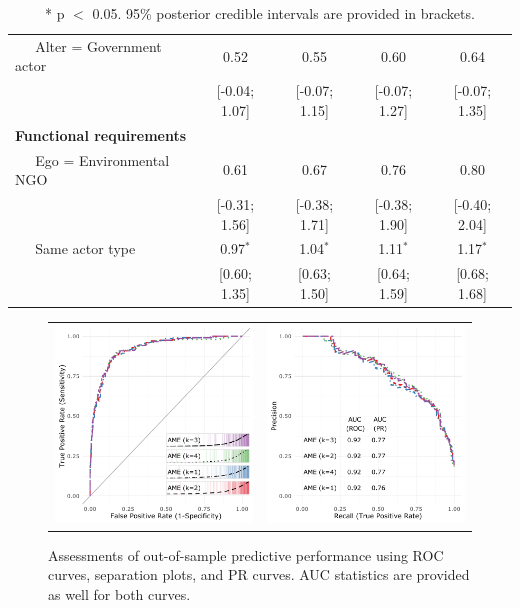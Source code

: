 \documentclass[12pt,pdflatex]{elsarticle}
\begin{document}
\begin{table}[ht]
\begin{tabular}{lcccc}
  $\;\;\;\;$ Alter = Government actor & 0.52 & 0.55 & 0.60 & 0.64 \\
   & [-0.04; 1.07] & [-0.07; 1.15] & [-0.07; 1.27] & [-0.07; 1.35] \\
  \textbf{Functional requirements} &  &  &  &  \\
  $\;\;\;\;$ Ego = Environmental NGO & 0.61 & 0.67 & 0.76 & 0.80 \\
   & [-0.31; 1.56] & [-0.38; 1.71] & [-0.38; 1.90] & [-0.40; 2.04] \\
  $\;\;\;\;$ Same actor type & 0.97$^{\ast}$ & 1.04$^{\ast}$ & 1.11$^{\ast}$ & 1.17$^{\ast}$ \\
   & [0.60; 1.35] & [0.63; 1.50] & [0.64; 1.59] & [0.68; 1.68] \\
   \hline
\hline
\end{tabular}
\endgroup
\caption{* p $<$ 0.05. 95\% posterior credible intervals are provided in brackets.}
\label{tab:regTable_ame}
\end{table}


\begin{figure}[ht]
	\centering
	\begin{tabular}{cc}
	\includegraphics[width=.5\textwidth]{roc_ameSR_outSample} &
	\includegraphics[width=.5\textwidth]{rocPr_ameSR_outSample}
	\end{tabular}
	\caption{Assessments of out-of-sample predictive performance using ROC curves, separation plots, and PR curves. AUC statistics are provided as well for both curves.}
	\label{fig:roc_ame}
\end{figure}
\end{document}

